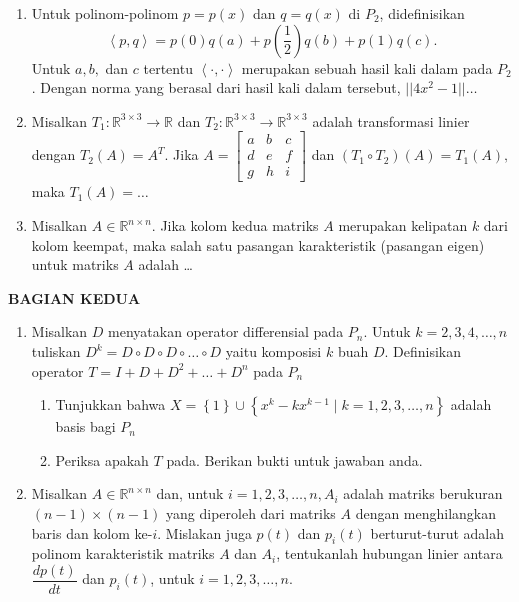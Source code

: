 \documentclass[12pt,twoside]{article}
\begin{document}
\begin{enumerate}
	\item Untuk polinom-polinom $p = p(x)$ dan $q = q(x)$ di $P_2$, didefinisikan $$\left< p,q \right> = p(0)q(a) + p(\dfrac{1}{2})q(b)+p(1)q(c).$$
	      Untuk $a,b,$ dan $c$ tertentu $\left< \cdot,\cdot \right>$ merupakan sebuah hasil kali dalam pada $P_2$. Dengan norma yang berasal dari hasil kali dalam tersebut, $||4x^2-1||\dots$

	\item Misalkan $T_1 : \mathbb{R}^{3 \times 3} \to \mathbb{R}$ dan $T_2 : \mathbb{R}^{3 \times 3} \to \mathbb{R}^{3 \times 3}$ adalah transformasi linier dengan $T_2(A) = A^T.$ Jika $A = \left[ \begin{array}{ccc}
				      a & b & c \\d&e&f\\g&h&i
			      \end{array} \right]$ dan $(T_1 \circ T_2)(A) = T_1(A),$ maka $T_1(A) = \dots$

	\item Misalkan $A \in \mathbb{R}^{n \times n}$. Jika kolom kedua matriks $A$ merupakan kelipatan $k$ dari kolom keempat, maka salah satu pasangan karakteristik (pasangan eigen) untuk matriks $A$ adalah \dots


\end{enumerate}

\newpage \textbf{BAGIAN KEDUA}
\begin{enumerate}
	\item Misalkan $D$ menyatakan operator differensial pada $P_n$. Untuk $k = 2,3,4 ,\dots, n$ tuliskan $D^k = D \circ D \circ D \circ\dots \circ D$ yaitu komposisi $k$ buah $D$. Definisikan operator $T = I+D+D^2+\dots+D^n$ pada $P_n$
	      \begin{enumerate}
		      \item Tunjukkan bahwa $X = \left\lbrace 1 \right\rbrace \cup \left\lbrace x^k-kx^{k-1}\mid k=1,2,3,\dots,n \right\rbrace$ adalah basis bagi $P_n$
		      \item Periksa apakah $T$ pada. Berikan bukti untuk jawaban anda.
	      \end{enumerate}

	\item Misalkan $A \in \mathbb{R}^{n \times n}$ dan, untuk $i = 1,2,3,\dots,n, A_i$ adalah matriks berukuran $(n-1) \times (n-1)$ yang diperoleh dari matriks $A$ dengan menghilangkan baris dan kolom ke-$i$. Mislakan juga $p(t)$ dan $p_i(t)$ berturut-turut adalah polinom karakteristik matriks $A$ dan $A_i$, tentukanlah hubungan linier antara $\dfrac{dp(t)}{dt}$ dan $p_i(t)$, untuk $i=1,2,3,\dots,n$.
\end{enumerate}
\end{document}
